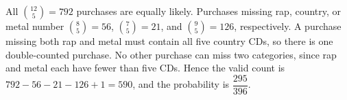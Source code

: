 All $\binom{12}{5}=792$ purchases are equally likely. Purchases missing rap, country, or metal number $\binom85=56$, $\binom75=21$, and $\binom95=126$, respectively. A purchase missing both rap and metal must contain all five country CDs, so there is one double-counted purchase. No other purchase can miss two categories, since rap and metal each have fewer than five CDs. Hence the valid count is $792-56-21-126+1=590$, and the probability is $\boxed{\dfrac{295}{396}}$.
